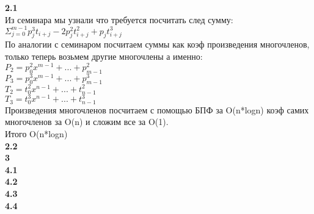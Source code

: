 \documentclass[a4paper,12pt]{article}
\begin{document}
\large\textbf{2.1}\normalsize\\
Из семинара мы узнали что требуется посчитать след сумму:\\
$\Sigma_{j=0}^{m-1} p_j^3t_{i+j} -2p_j^2t_{i+j}^2 + p_{j}t_{i+j}^3$\\
По аналогии с семинаром посчитаем суммы как коэф произведения многочленов, только теперь возьмем другие многочлены а именно:\\
$P_2 = p_0^2x^{m-1} + ... + p_{m-1}^2$\\
$P_3 = p_0^3x^{m-1} + ... + p_{m-1}^3$\\
$T_2 = t_0^2x^{n-1} + ... + t_{n-1}^2$\\
$T_3 = t_0^3x^{n-1} + ... + t_{n-1}^3$\\
Произведения многочленов посчитаем с помощью БПФ за O(n*logn) коэф самих многочленов за O(n) и сложим все за O(1).\\
Итого O(n*logn)\\
\large\textbf{2.2}\normalsize\\
\large\textbf{3}\normalsize\\
\large\textbf{4.1}\normalsize\\
\large\textbf{4.2}\normalsize\\
\large\textbf{4.3}\normalsize\\
\large\textbf{4.4}\normalsize\\
\end{document}
